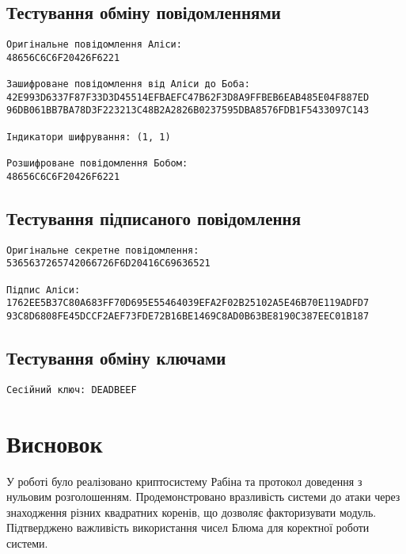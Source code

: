 \documentclass{article}
\begin{document}
\subsection{Тестування обміну повідомленнями}
\begin{verbatim}
Оригінальне повідомлення Аліси: 
48656C6C6F20426F6221

Зашифроване повідомлення від Аліси до Боба:
42E993D6337F87F33D3D45514EFBAEFC47B62F3D8A9FFBEB6EAB485E04F887ED
96DB061BB7BA78D3F223213C48B2A2826B0237595DBA8576FDB1F5433097C143

Індикатори шифрування: (1, 1)

Розшифроване повідомлення Бобом:
48656C6C6F20426F6221
\end{verbatim}

\subsection{Тестування підписаного повідомлення}
\begin{verbatim}
Оригінальне секретне повідомлення:
5365637265742066726F6D20416C69636521

Підпис Аліси:
1762EE5B37C80A683FF70D695E55464039EFA2F02B25102A5E46B70E119ADFD7
93C8D6808FE45DCCF2AEF73FDE72B16BE1469C8AD0B63BE8190C387EEC01B187
\end{verbatim}

\subsection{Тестування обміну ключами}
\begin{verbatim}
Сесійний ключ: DEADBEEF
\end{verbatim}

\section{Висновок}
У роботі було реалізовано криптосистему Рабіна та протокол доведення з нульовим розголошенням. Продемонстровано вразливість системи до атаки через знаходження різних квадратних коренів, що дозволяє факторизувати модуль. Підтверджено важливість використання чисел Блюма для коректної роботи системи.
\end{document}
